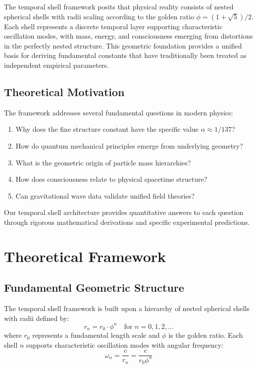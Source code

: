 \documentclass[12pt,a4paper]{article}
\begin{document}
The temporal shell framework posits that physical reality consists of nested spherical shells with radii scaling according to the golden ratio $\phi = (1+\sqrt{5})/2$. Each shell represents a discrete temporal layer supporting characteristic oscillation modes, with mass, energy, and consciousness emerging from distortions in the perfectly nested structure. This geometric foundation provides a unified basis for deriving fundamental constants that have traditionally been treated as independent empirical parameters.

\subsection{Theoretical Motivation}

The framework addresses several fundamental questions in modern physics:
\begin{enumerate}
\item Why does the fine structure constant have the specific value $\alpha \approx 1/137$?
\item How do quantum mechanical principles emerge from underlying geometry?
\item What is the geometric origin of particle mass hierarchies?
\item How does consciousness relate to physical spacetime structure?
\item Can gravitational wave data validate unified field theories?
\end{enumerate}

Our temporal shell architecture provides quantitative answers to each question through rigorous mathematical derivations and specific experimental predictions.

\section{Theoretical Framework}

\subsection{Fundamental Geometric Structure}

The temporal shell framework is built upon a hierarchy of nested spherical shells with radii defined by:
\begin{equation}
r_n = r_0 \cdot \phi^n \quad \text{for } n = 0, 1, 2, \ldots
\end{equation}
where $r_0$ represents a fundamental length scale and $\phi$ is the golden ratio. Each shell $n$ supports characteristic oscillation modes with angular frequency:
\begin{equation}
\omega_n = \frac{c}{r_n} = \frac{c}{r_0 \phi^n}
\end{equation}
\end{document}
